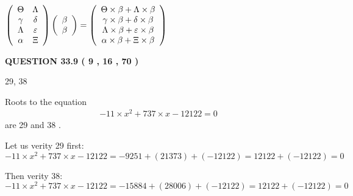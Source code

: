 \documentclass[12pt]{article}
\begin{document}
$  %
 \left( \begin{array}
 {
 c
 c
 }
 \Theta & 
 \Lambda \\ 
 \gamma & 
 \delta \\ 
 \Lambda & 
 \varepsilon \\ 
 \alpha & 
                    \Xi
 \end{array} \right)
 \left( \begin{array}
 {
 c
 }
 \beta \\ 
 \beta
 \end{array} \right)
=
 \left( \begin{array}
 {
 c
 }
  \Theta \times  \beta +  \Lambda \times  \beta \\ 
  \gamma \times  \beta +  \delta \times  \beta \\ 
  \Lambda \times  \beta +  \varepsilon \times  \beta \\ 
  \alpha \times  \beta +                     \Xi \times  \beta
 \end{array} \right)
$
 
 
 
 
 
\noindent{}

 
 
  
\vspace{0.2in}
  
{\textbf{\Large{QUESTION
33.9 
 (           9 ,          16 ,          70 )
}}}
  
  


 
 
\noindent{}

29,  %
38
 
 
 
 
 
\noindent{}

Roots to the equation
\begin{eqnarray*}
-11 \times x^2  %
+  %
737
                 \times x    %
-12122 =0
\end{eqnarray*}
are  %
29 and  %
38 .
 
Let us verity  %
29 first:
$  %
-11 \times x^2  %
+  %
737
                 \times x    %
-12122
  = %
-9251+( %
21373)+( %
-12122)
  = %
12122+( %
-12122)
  = %
0
$
 
Then verity  %
38:
$  %
-11 \times x^2  %
+  %
737
                 \times x    %
-12122
  = %
-15884+( %
28006)+( %
-12122)
  = %
12122+( %
-12122)
  = %
0
$
 
\end{document}
